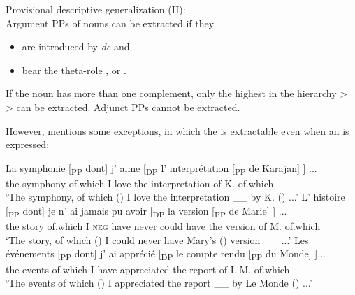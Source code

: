 \documentclass[output=paper]{langsci/langscibook}
\begin{document}
\begin{exe}
\ex%
    \label{ex:mensch:11}
Provisional descriptive generalization (II):\\
          Argument PPs of nouns can be extracted if they
          
            \begin{itemize}
                \item are introduced by \textit{de} and
                \item bear the theta-role \AGENT, \THEME or \POSSESSOR.
            \end{itemize}
If the noun has more than one complement, only the highest in the hierarchy  \POSSESSOR > \AGENT > \THEME can be extracted. Adjunct PPs cannot be extracted.
\end{exe}

However, \citet[160]{Pollock1989} mentions some exceptions, in which the \THEME is extractable even when an \AGENT is expressed:

\ea%
    \label{ex:mensch:12}
    \ea
    \gll La symphonie  [\textsubscript{PP} dont]  j’  aime  [\textsubscript{DP} l’  interprétation      [\textsubscript{PP} de Karajan]  \soutp{[\textsubscript{PP}}{2} \soute{dont]}] ...\\
         the symphony {} of.which  I   love   {}     the interpretation     {}       of  K. {}     of.which\\
    \glt ‘The symphony, of which (\THEME) I love the interpretation \_\_ by K. (\AGENT) ...’
    \ex  
    \gll L’  histoire [\textsubscript{PP}  dont]     je   n’  ai  jamais  pu  avoir [\textsubscript{DP} la    version   [\textsubscript{PP}  de Marie] \soutp{[\textsubscript{PP}}{2}  \soute{dont]}] ...\\
         the  story  {}   of.which     I   \textsc{neg}  have  never  could  have {}  the      version {}    of M.  {}  of.which \\
    \glt ‘The story, of which (\THEME) I could never have Mary’s (\AGENT) version \_\_ ...’
    \ex  
    \gll Les  événements [\textsubscript{PP}  dont]  j’ ai  apprécié [\textsubscript{DP} le  {compte rendu}     [\textsubscript{PP}  du Monde] \soutp{[\textsubscript{PP}}{2}  \soute{dont]}]...\\
         the  events {}    of.which  I have  appreciated {}  the  report {}  of L.M.  {}  of.which\\
    \glt ‘The events of which (\THEME) I appreciated the report \_\_ by Le Monde (\AGENT) ...’
    \z
\z
\end{document}
